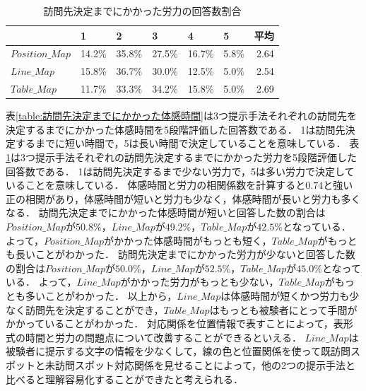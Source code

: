 \documentclass{deimj}
\begin{document}
\begin{table}[t]
    \caption{訪問先決定までにかかった労力の回答数割合}
    \label{table:訪問先決定までにかかった労力}
    \centering
    \begin{tabular}{l|rrrrr|r}
    \hline
                  & \multicolumn{1}{l}{1} & \multicolumn{1}{l}{2} & \multicolumn{1}{l}{3} & \multicolumn{1}{l}{4} & \multicolumn{1}{l|}{5} & \multicolumn{1}{l}{平均} \\ \hline
    $Position\_Map$ & 14.2\%               & 35.8\%               & 27.5\%               & 16.7\%               & 5.8\%                 & 2.64                   \\
    $Line\_Map$     & 15.8\%               & 36.7\%               & 30.0\%               & 12.5\%               & 5.0\%                 & 2.54                   \\
    $Table\_Map$    & 11.7\%               & 33.3\%               & 34.2\%               & 15.8\%               & 5.0\%                 & 2.69                   \\ \hline
    \end{tabular}
\end{table}

表\ref{table:訪問先決定までにかかった体感時間}は3つ提示手法それぞれの訪問先を決定するまでにかかった体感時間を5段階評価した回答数である．
1は訪問先決定するまでに短い時間で，5は長い時間で決定していることを意味している．
表\ref{table:訪問先決定までにかかった労力}は3つ提示手法それぞれの訪問先決定するまでにかかった労力を5段階評価した回答数である．
1は訪問先決定するまで少ない労力で，5は多い労力で決定していることを意味している．
体感時間と労力の相関係数を計算すると$0.74$と強い正の相関があり，体感時間が短いと労力も少なく，体感時間が長いと労力も多くなる．
訪問先決定までにかかった体感時間が短いと回答した数の割合は$Position\_Map$が$50.8\%$，$Line\_Map$が$49.2\%$，$Table\_Map$が$42.5\%$となっている．
よって，$Position\_Map$がかかった体感時間がもっとも短く，$Table\_Map$がもっとも長いことがわかった．
訪問先決定までにかかった労力が少ないと回答した数の割合は$Position\_Map$が$50.0\%$，$Line\_Map$が$52.5\%$，$Table\_Map$が$45.0\%$となっている．
よって，$Line\_Map$がかかった労力がもっとも少ない，$Table\_Map$がもっとも多いことがわかった．
以上から，$Line\_Map$は体感時間が短くかつ労力も少なく訪問先を決定することができ，$Table\_Map$はもっとも被験者にとって手間がかかっていることがわかった．
対応関係を位置情報で表すことによって，表形式の時間と労力の問題点について改善することができるといえる．
$Line\_Map$は被験者に提示する文字の情報を少なくして，線の色と位置関係を使って既訪問スポットと未訪問スポット対応関係を見せることによって，他の2つの提示手法と比べると理解容易化することができたと考えられる．
\end{document}
